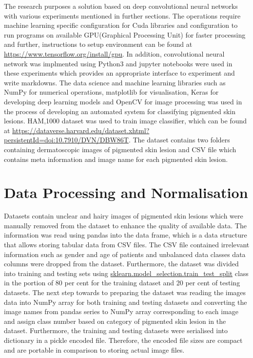 The research purposes a solution based on deep convolutional neural networks with various experiments mentioned in further sections.
The operations require machine learning specific configuration for Cuda libraries and configuration to run programs on available GPU(Graphical Processing Unit) for faster processing and further, 
instructions to setup environment can be found at \url{https://www.tensorflow.org/install/gpu}. In addition, convolutional neural network was implmented using Python3 and jupyter notebooks were used in these experiments 
which provides an appropriate interface to experiment and write markdowns.
The data science and machine learning libraries such as NumPy for numerical operations, matplotlib for visualisation, Keras for developing deep learning models and OpenCV for image processing was used in the process of developing an automated system for classifying pigmented skin lesions.
HAM,1000 dataset was used to train image classifier, which can be found at
\url{https://dataverse.harvard.edu/dataset.xhtml?persistentId=doi:10.7910/DVN/DBW86T}. The dataset contains two folders containing dermatoscopic images of pigmented skin lesion and CSV file which contains meta information and image name for each pigmented skin lesion.

\section{Data Processing and Normalisation}
Datasets contain unclear and hairy images of pigmented skin lesions which were manually 
removed from the dataset to enhance the quality of available data. The information was read using pandas into the data frame, 
which is a data structure that allows storing tabular data from CSV files. The CSV file contained irrelevant information such as gender and age of 
patients and unbalanced data classes data columns were dropped from the dataset. Furthermore, the dataset was divided into training and 
testing sets using \url{sklearn.model_selection.train_test_split} class in the portion of 80 per cent for 
the training dataset and 20 per cent of testing datasets. The next step towards to preparing the dataset was reading the images data into NumPy 
array for both training and testing datasets and converting the image names from pandas series to NumPy array corresponding to each image and assign class number 
based on category of pigmented skin lesion in the dataset. Furthermore, the training and testing datasets were serialised into 
dictionary in a pickle encoded file. Therefore, the encoded file sizes are compact and are portable
in comparison to storing actual image files.


